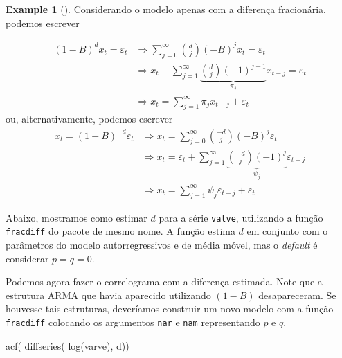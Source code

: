 \documentclass[
  letterpaper,
  DIV=11,
  numbers=noendperiod]{scrartcl}
\newenvironment{Shaded}{\begin{snugshade}}{\end{snugshade}}
\newcommand{\FunctionTok}[1]{\textcolor[rgb]{0.28,0.35,0.67}{#1}}
\newcommand{\NormalTok}[1]{\textcolor[rgb]{0.00,0.23,0.31}{#1}}
\newcommand{\OtherTok}[1]{\textcolor[rgb]{0.00,0.23,0.31}{#1}}
\newcommand{\SpecialCharTok}[1]{\textcolor[rgb]{0.37,0.37,0.37}{#1}}
\theoremstyle{definition}
\newtheorem{example}{Example}[chapter]
\theoremstyle{definition}
\theoremstyle{plain}
\theoremstyle{plain}
\theoremstyle{remark}
\begin{document}
\begin{example}[]
Considerando o modelo apenas com a diferença fracionária, podemos
escrever

\begin{align}(1-B)^d x_t=\varepsilon_t&\Rightarrow \sum_{j=0}^\infty {d \choose j}(-B)^jx_t=\varepsilon_t\\ &\Rightarrow x_t-\sum_{j=1}^\infty \underbrace{{d \choose j}(-1)^{j-1}}_{\pi_j}x_{t-j}=\varepsilon_t\\
&\Rightarrow x_t=\sum_{j=1}^\infty \pi_j x_{t-j}+\varepsilon_t\end{align}
ou, alternativamente, podemos escrever
\begin{align} x_t=(1-B)^{-d}\varepsilon_t&\Rightarrow x_t=\sum_{j=0}^\infty {-d \choose j}(-B)^j\varepsilon_t\\ &\Rightarrow x_t=\varepsilon_t +\sum_{j=1}^\infty \underbrace{{-d \choose j}(-1)^j}_{\psi_j}\varepsilon_{t-j}\\
&\Rightarrow x_t=\sum_{j=1}^\infty \psi_j \varepsilon_{t-j}+\varepsilon_t\end{align}

Abaixo, mostramos como estimar \(d\) para a série \texttt{valve},
utilizando a função \texttt{fracdiff} do pacote de mesmo nome. A função
estima \(d\) em conjunto com o parâmetros do modelo autorregressivos e
de média móvel, mas o \emph{default} é considerar \(p=q=0\).

\begin{Shaded}
\end{Shaded}

Podemos agora fazer o correlograma com a diferença estimada. Note que a
estrutura ARMA que havia aparecido utilizando \((1-B)\) desapareceram.
Se houvesse tais estruturas, deveríamos construir um novo modelo com a
função \texttt{fracdiff} colocando os argumentos \texttt{nar} e
\texttt{nam} representando \(p\) e \(q\).

\begin{Shaded}
\begin{Highlighting}[]
\FunctionTok{acf}\NormalTok{( }\FunctionTok{diffseries}\NormalTok{( }\FunctionTok{log}\NormalTok{(varve), d))}
\end{Highlighting}
\end{Shaded}


\end{example}
\end{document}
